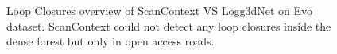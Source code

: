\begin{figure}[t]
  \centering
  \caption{Loop Closures overview of ScanContext VS Logg3dNet on Evo dataset. ScanContext could not detect any loop closures inside the dense forest but only in open access roads. }
  \label{fig:exp_2_3_loop_closure_comparison}
\end{figure}

